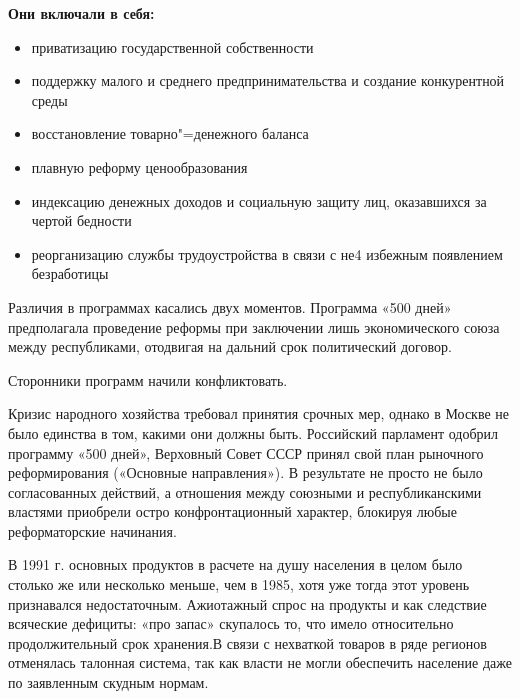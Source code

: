  \textbf{Они включали в себя:}

\begin{itemize}
    \item приватизацию государственной собственности
    \item поддержку малого и среднего предпринимательства и создание конкурентной среды
    \item восстановление товарно"=денежного баланса
    \item плавную реформу ценообразования
    \item индексацию денежных доходов и социальную защиту лиц, оказавшихся за чертой бедности
    \item реорганизацию службы трудоустройства в связи с не4 избежным появлением безработицы
\end{itemize}

Различия в программах касались двух моментов. Программа «500 дней» предполагала проведение реформы при заключении лишь экономического союза между республиками, отодвигая на дальний срок политический договор.

Сторонники программ начили конфликтовать.

Кризис народного хозяйства требовал принятия срочных мер, однако в Москве не было единства в том, какими они должны быть. Российский парламент одобрил программу «500 дней», Верховный Совет СССР принял свой план рыночного реформирования («Основные направления»). В результате не просто не было согласованных действий, а отношения между союзными и республиканскими властями приобрели остро конфронтационный характер, блокируя любые реформаторские начинания. 

В 1991 г. основных продуктов в расчете на душу населения в целом было столько же или несколько меньше, чем в 1985, хотя уже тогда этот уровень признавался недостаточным. Ажиотажный спрос на продукты и как следствие всяческие дефициты: «про запас» скупалось то, что имело относительно продолжительный срок хранения.В связи с нехваткой товаров в ряде регионов отменялась талонная система, так как власти не могли обеспечить население даже по заявленным скудным нормам.